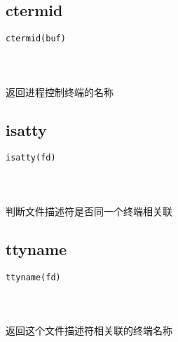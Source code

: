 \documentclass[10pt,a4paper]{article}
\begin{document}
\subsection{ctermid}
\begin{spacing}{2.0}
\lstset{language=C,numbers=none}
\begin{lstlisting}
ctermid(buf)
\end{lstlisting}
{\large\color[rgb]{0.2,0.4,0.6}{buf:}}
\paragraph{ \ \ }返回进程控制终端的名称
\end{spacing}

\subsection{isatty}
\begin{spacing}{2.0}
\lstset{language=C,numbers=none}
\begin{lstlisting}
isatty(fd)
\end{lstlisting}
{\large\color[rgb]{0.2,0.4,0.6}{fd:}}
\paragraph{ \ \ }判断文件描述符是否同一个终端相关联
\end{spacing}

\subsection{ttyname}
\begin{spacing}{2.0}
\lstset{language=C,numbers=none}
\begin{lstlisting}
ttyname(fd)
\end{lstlisting}
{\large\color[rgb]{0.2,0.4,0.6}{fd:}}
\paragraph{ \ \ }返回这个文件描述符相关联的终端名称
\end{spacing}

\section{\color[rgb]{0.2,0.4,0.6}{IO多路复用}}
\end{document}
